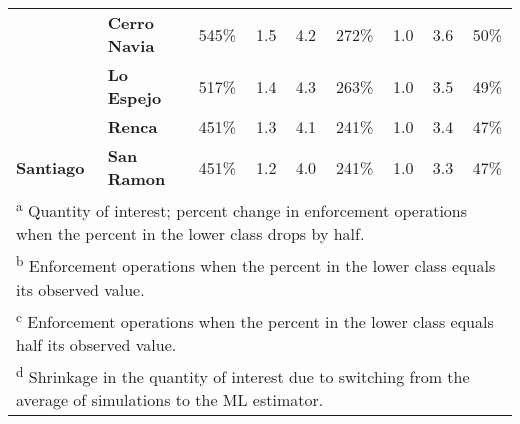 \begin{table}[!h]
\begin{tabular}[t]{>{}l>{}lccccccc}
 & \textbf{Cerro Navia} & 545\% & 1.5 & 4.2 & 272\% & 1.0 & 3.6 & 50\%\\

 & \textbf{Lo Espejo} & 517\% & 1.4 & 4.3 & 263\% & 1.0 & 3.5 & 49\%\\

 & \textbf{Renca} & 451\% & 1.3 & 4.1 & 241\% & 1.0 & 3.4 & 47\%\\

\multirow{-5}{*}{\raggedright\arraybackslash \textbf{Santiago}} & \textbf{San Ramon} & 451\% & 1.2 & 4.0 & 241\% & 1.0 & 3.3 & 47\%\\
\bottomrule
\multicolumn{9}{l}{\textsuperscript{a} Quantity of interest; percent change in enforcement operations when the percent in the lower class drops by half.}\\
\multicolumn{9}{l}{\textsuperscript{b} Enforcement operations when the percent in the lower class equals its observed value.}\\
\multicolumn{9}{l}{\textsuperscript{c} Enforcement operations when the percent in the lower class equals half its observed value.}\\
\multicolumn{9}{l}{\textsuperscript{d} Shrinkage in the quantity of interest due to switching from the average of simulations to the ML estimator.}\\
\end{tabular}
\end{table}